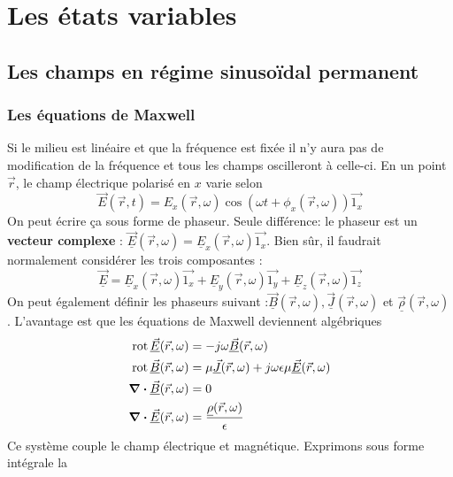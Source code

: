\chapter{Les états variables}
\section{Les champs en régime sinusoïdal permanent}
	\subsection{Les équations de Maxwell}	
	Si le milieu est linéaire et que la fréquence est fixée il  n'y aura pas de modification 
	de la fréquence et tous les champs oscilleront à celle-ci. En un point $\vec{r}$, le champ 
	électrique polarisé en $x$ varie selon
	\begin{equation}
	\vec{E}(\vec{r},t) = E_x(\vec{r},\omega)\cos(\omega t + \phi_x(\vec{r},\omega))\vec{1_x}
	\end{equation}
	On peut écrire ça sous forme de phaseur. Seule différence: le phaseur est un \textbf{vecteur 
	complexe} : $\underline{\vec{E}}(\vec{r},\omega) = \underline{E}_x(\vec{r},\omega)\vec{1_x}$.
	Bien sûr, il faudrait normalement considérer les trois composantes :
	\begin{equation}
	\underline{\vec{E}} = \underline{E}_x(\vec{r},\omega)\vec{1_x}+\underline{E}_y(\vec{r}
	,\omega)\vec{1_y}+\underline{E}_z(\vec{r},\omega)\vec{1_z}
	\end{equation}
	On peut également définir les phaseurs suivant :$\underline{\vec{B}}(\vec{r},\omega), 
	\underline{\vec{J}}(\vec{r},\omega)$ et $\underline{\vec{\rho}}(\vec{r},\omega)$. L'avantage 
	est que les équations de Maxwell deviennent algébriques
	\begin{equation}
	\begin{split}
	\text{rot}\, \underline{\vec{E}}(\vec{r},\omega) &= -j\omega\underline{\vec{B}}(\vec{r},\omega)\\
	\text{rot}\, \underline{\vec{B}}	(\vec{r},\omega) &= \mu\underline{\vec{J}}(\vec{r},\omega) +
	j\omega\epsilon\mu\underline{\vec{E}}(\vec{r},\omega)\\
	\div \underline{\vec{B}}(\vec{r},\omega) &= 0\\
	\div \underline{\vec{E}}(\vec{r},\omega) &= \dfrac{\underline{\rho}(\vec{r},\omega)}{\epsilon}
	\end{split}
	\end{equation}
	Ce système couple le champ électrique et magnétique. Exprimons sous forme intégrale la 
